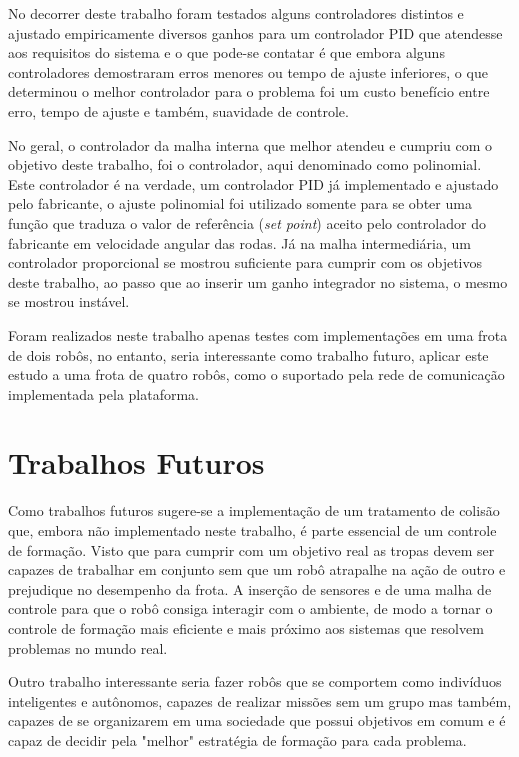 No decorrer deste trabalho foram testados alguns controladores distintos e ajustado empiricamente diversos ganhos para um controlador PID que atendesse aos requisitos do sistema e o que pode-se contatar é que embora alguns controladores demostraram erros menores ou tempo de ajuste inferiores, o que determinou o melhor controlador para o problema foi um custo benefício entre erro, tempo de ajuste e também, suavidade de controle. 

No geral, o controlador da malha interna que melhor atendeu e cumpriu com o objetivo deste trabalho, foi o controlador, aqui denominado como polinomial. %
Este controlador é na verdade, um controlador PID já implementado e ajustado pelo fabricante, o ajuste polinomial foi utilizado somente para se obter uma função que traduza o valor de referência (\emph{set point}) aceito pelo controlador do fabricante em velocidade angular das rodas. Já na malha intermediária, um controlador proporcional se mostrou suficiente para cumprir com os objetivos deste trabalho, ao passo que ao inserir um ganho integrador no sistema, o mesmo se mostrou instável.

Foram realizados neste trabalho apenas testes com implementações em uma frota de dois robôs, no entanto, seria interessante como trabalho futuro, aplicar este estudo a uma frota de quatro robôs, como o suportado pela rede de comunicação implementada pela plataforma. 

\section{Trabalhos Futuros}
 \label{sec:trabFuturos}
 Como trabalhos futuros sugere-se a implementação de um tratamento de colisão que, embora não implementado neste trabalho, é parte essencial de um controle de formação. Visto que para cumprir com um objetivo real as tropas devem ser capazes de trabalhar em conjunto sem que um robô atrapalhe na ação de outro e prejudique no desempenho da frota. A inserção de sensores e de uma malha de controle para que o robô consiga interagir com o ambiente, de modo a tornar o controle de formação mais eficiente e mais próximo aos sistemas que resolvem problemas no mundo real.
 
 Outro trabalho interessante seria fazer robôs que se comportem como indivíduos inteligentes e autônomos, capazes de realizar missões sem um grupo mas também, capazes de se organizarem em uma sociedade que possui objetivos em comum e é capaz de decidir pela "melhor" estratégia de formação para cada problema.
 
 
